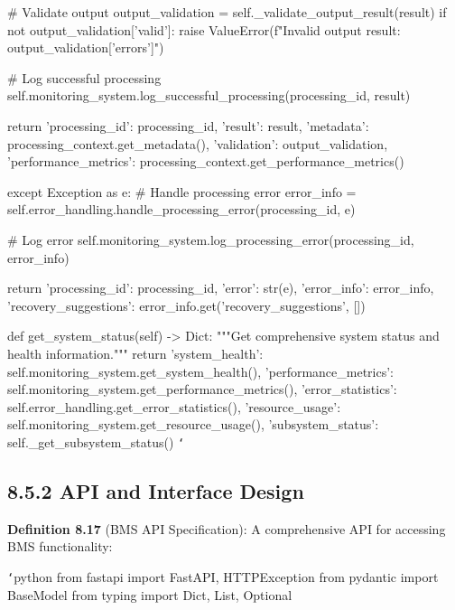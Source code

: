             \# Validate output
            output_validation = self._validate_output_result(result)
            if not output_validation['valid']:
                raise ValueError(f"Invalid output result: {output_validation['errors']}")
            
            \# Log successful processing
            self.monitoring_system.log_successful_processing(processing_id, result)
            
            return {
                'processing_id': processing_id,
                'result': result,
                'metadata': processing_context.get_metadata(),
                'validation': output_validation,
                'performance_metrics': processing_context.get_performance_metrics()
            }
            
        except Exception as e:
            \# Handle processing error
            error_info = self.error_handling.handle_processing_error(processing_id, e)
            
            \# Log error
            self.monitoring_system.log_processing_error(processing_id, error_info)
            
            return {
                'processing_id': processing_id,
                'error': str(e),
                'error_info': error_info,
                'recovery_suggestions': error_info.get('recovery_suggestions', [])
            }
            
    def get_system_status(self) -> Dict:
        """Get comprehensive system status and health information."""
        return {
            'system_health': self.monitoring_system.get_system_health(),
            'performance_metrics': self.monitoring_system.get_performance_metrics(),
            'error_statistics': self.error_handling.get_error_statistics(),
            'resource_usage': self.monitoring_system.get_resource_usage(),
            'subsystem_status': self._get_subsystem_status()
        }
\texttt{`}

\subsection{8.5.2 API and Interface Design}

\textbf{Definition 8.17} (BMS API Specification): A comprehensive API for accessing BMS functionality:

\texttt{`}python
from fastapi import FastAPI, HTTPException
from pydantic import BaseModel
from typing import Dict, List, Optional

